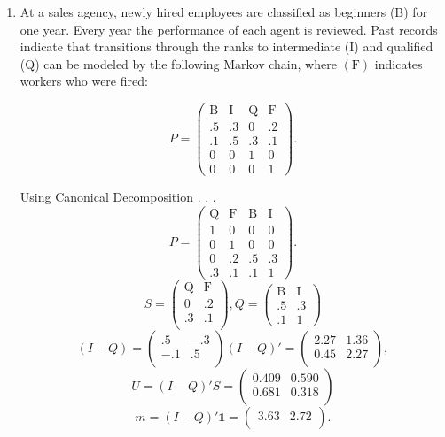 \documentclass{article} %
\theoremstyle{plain}
\theoremstyle{case}
\begin{document}
\begin{enumerate}[label={\fbox{\textbf{Exercise \#\arabic* :}}}]
\newpage
  \item At a sales agency, newly hired employees are classified as beginners (B) for one year. Every year the performance of each agent is reviewed. Past records indicate that transitions through the ranks to intermediate (I) and qualified (Q) can be modeled by the following Markov chain, where $(\mathrm{F})$ indicates workers who were fired:

$$
P=\left(\begin{array}{cccc}
\mathrm{B} & \mathrm{I} & \mathrm{Q} & \mathrm{F} \\
.5 & .3 & 0 & .2 \\
.1 & .5 & .3 & .1 \\
0 & 0 & 1 & 0 \\
0 & 0 & 0 & 1
\end{array}\right) .
$$

Using Canonical Decomposition . . .
\[
P=\left(\begin{array}{cccc}
\mathrm{Q} & \mathrm{F} & \mathrm{B} & \mathrm{I} \\
1 & 0 & 0 & 0 \\
0 & 1 & 0 & 0 \\
0 & .2 & .5 & .3 \\
.3 & .1 & .1 & 1
\end{array}\right) .
\]
\[
S=\left(\begin{array}{cccc}
\mathrm{Q} & \mathrm{F} \\
0 & .2 \\
.3 & .1 \\
\end{array}\right) , 
Q=\left(\begin{array}{cccc}
\mathrm{B} & \mathrm{I} \\
.5 & .3 \\
.1 & 1
\end{array}\right)
\]
\[
  (I-Q)=\left(\begin{array}{cccc}
.5 & -.3 \\
-.1 & .5 \\
\end{array}\right)
(I-Q)'=\left(\begin{array}{cccc}
2.27 & 1.36 \\
0.45 & 2.27 \\
\end{array}\right) ,
\]
\[
U=(I-Q)'S=\left(\begin{array}{cccc}
0.409 & 0.590 \\
0.681 & 0.318 \\
\end{array}\right)
\]
\[
m=(I-Q)'\mathbb{1} =\left(\begin{array}{cccc}
3.63 & 2.72 \\
\end{array}\right) .
\]
  \begin{enumerate}
    


\end{enumerate}
\end{enumerate}
\end{document}
